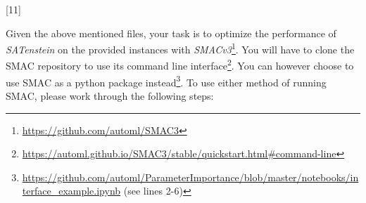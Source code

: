 \documentclass{exam}
\begin{document}
	\begin{questions}
		
		[11]
		
		Given the above mentioned files, your task is to optimize the performance of \textit{SATenstein} on the provided instances with \textit{SMACv3}\footnote{\url{https://github.com/automl/SMAC3}}. You will have to clone the SMAC repository to use its command line interface\footnote{\url{https://automl.github.io/SMAC3/stable/quickstart.html\#command-line}}. You can however choose to use SMAC as a python package instead\footnote{\url{https://github.com/automl/ParameterImportance/blob/master/notebooks/interface_example.ipynb} (see lines 2-6)}.
		To use either method of running SMAC, please work through the following steps:
		

\end{questions}
\end{document}
